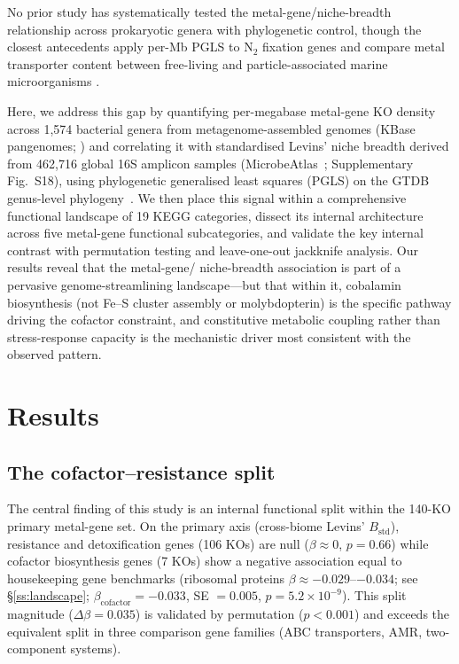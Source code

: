 \documentclass[times]{zHenriquesLab-StyleBioRxiv}
\begin{document}
No prior study has systematically tested the metal-gene/niche-breadth relationship
across prokaryotic genera with phylogenetic control, though the closest antecedents
apply per-Mb PGLS to N$_2$ fixation genes \cite{sobol2026} and compare metal
transporter content between free-living and particle-associated marine
microorganisms \cite{leu2022}.

Here, we address this gap by quantifying per-megabase metal-gene KO density
across 1,574 bacterial genera from metagenome-assembled genomes (KBase
pangenomes; \cite{arkin2018}) and correlating it with standardised Levins'
niche breadth derived from 462,716 global 16S amplicon samples
(MicrobeAtlas~\cite{rodrigues2026}; Supplementary Fig.~S18), using phylogenetic generalised least
squares (PGLS) on the GTDB genus-level phylogeny~\cite{parks2022}. We then place this signal
within a comprehensive functional landscape of 19 KEGG categories, dissect its
internal architecture across five metal-gene functional subcategories, and
validate the key internal contrast with permutation testing and
leave-one-out jackknife analysis. Our results reveal that the metal-gene/
niche-breadth association is part of a pervasive genome-streamlining
landscape---but that within it, cobalamin biosynthesis (not Fe--S cluster
assembly or molybdopterin) is the specific pathway driving the cofactor
constraint, and constitutive metabolic coupling rather than stress-response
capacity is the mechanistic driver most consistent with the observed pattern.



\section*{Results}
\setcounter{subsection}{0}


\subsection{The cofactor--resistance split}
\label{ss:polarity}
\label{ss:split}

The central finding of this study is an internal functional split within
the 140-KO primary metal-gene set. On the primary axis (cross-biome Levins'
$B_\text{std}$), resistance and detoxification genes (106 KOs) are null
($\beta \approx 0$, $p = 0.66$) while cofactor biosynthesis genes (7 KOs)
show a negative association equal to housekeeping gene benchmarks
(ribosomal proteins $\beta \approx -0.029$--$-0.034$; see \S\ref{ss:landscape};
$\beta_{\text{cofactor}} = -0.033$, SE $= 0.005$, $p = 5.2 \times 10^{-9}$). This split
magnitude ($\Delta\beta = 0.035$) is validated by permutation ($p < 0.001$)
and exceeds the equivalent split in three comparison gene families (ABC
transporters, AMR, two-component systems).
\end{document}
